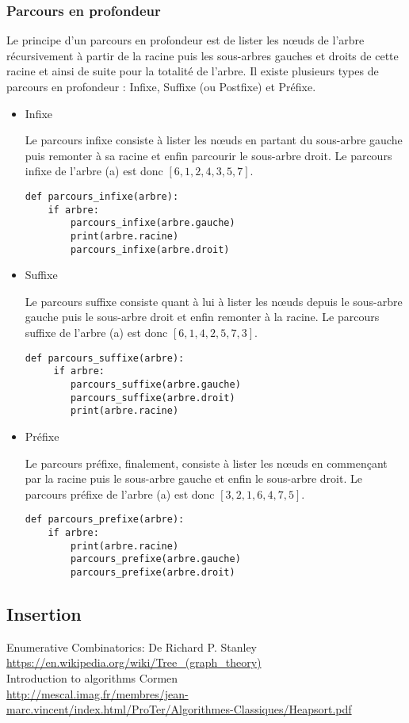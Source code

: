 \documentclass{report}
\begin{document}
\subsubsection{Parcours en profondeur}
Le principe d'un parcours en profondeur est de lister les nœuds de l'arbre récursivement à partir de la racine puis les sous-arbres gauches et droits de cette racine et ainsi de suite pour la totalité de l'arbre.
Il existe plusieurs types de parcours en profondeur : Infixe, Suffixe (ou Postfixe) et Préfixe.
\begin{itemize}
\item Infixe

Le parcours infixe consiste à lister les nœuds en partant du sous-arbre gauche puis remonter à sa racine et enfin parcourir le sous-arbre droit.
Le parcours infixe de l'arbre (a) est donc $[6, 1, 2, 4, 3, 5, 7]$.
\begin{lstlisting}
def parcours_infixe(arbre): 
    if arbre: 
        parcours_infixe(arbre.gauche) 
        print(arbre.racine)
        parcours_infixe(arbre.droit) 
\end{lstlisting}

\item Suffixe

Le parcours suffixe consiste quant à lui à lister les nœuds depuis le sous-arbre gauche puis le sous-arbre droit et enfin remonter à la racine.
Le parcours suffixe de l'arbre (a) est donc $[6, 1, 4, 2, 5, 7, 3]$.
\begin{lstlisting}
def parcours_suffixe(arbre): 
     if arbre: 
        parcours_suffixe(arbre.gauche) 
        parcours_suffixe(arbre.droit) 
        print(arbre.racine)
\end{lstlisting}

\item Préfixe

Le parcours préfixe, finalement, consiste à lister les nœuds en commençant par la racine puis le sous-arbre gauche et enfin le sous-arbre droit.
Le parcours préfixe de l'arbre (a) est donc $[3, 2, 1, 6, 4, 7, 5]$.
\begin{lstlisting}
def parcours_prefixe(arbre):
    if arbre:
        print(arbre.racine)
        parcours_prefixe(arbre.gauche)
        parcours_prefixe(arbre.droit)
\end{lstlisting}

\end{itemize}

\subsection{Insertion}


Enumerative Combinatorics: De Richard P. Stanley \\
\url{https://en.wikipedia.org/wiki/Tree_(graph_theory)}\\
Introduction to algorithms Cormen\\
\url{http://mescal.imag.fr/membres/jean-marc.vincent/index.html/ProTer/Algorithmes-Classiques/Heapsort.pdf}\\





\listoffigures
\end{document}
